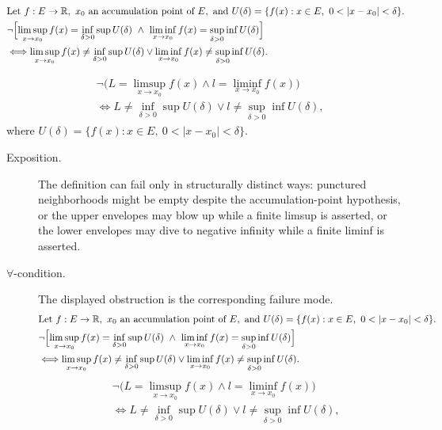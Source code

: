 \begin{remark*}
\[
\begin{aligned}
&\text{Let } f:E\to\mathbb{R},\ x_0 \text{ an accumulation point of } E,\ \text{and } U(\delta)=\{f(x):x\in E,\ 0<|x-x_0|<\delta\}.\\
&\neg\Bigl[\limsup_{x\to x_0} f(x)=\inf_{\delta>0}\sup U(\delta)\ \land\ \liminf_{x\to x_0} f(x)=\sup_{\delta>0}\inf U(\delta)\Bigr]\\
&\Longleftrightarrow
\limsup_{x\to x_0} f(x)\ne\inf_{\delta>0}\sup U(\delta)
\lor
\liminf_{x\to x_0} f(x)\ne\sup_{\delta>0}\inf U(\delta).
\end{aligned}
\]
\end{remark*}

\begin{remark*}
\[
\begin{aligned}
&\neg\bigl(L=\limsup_{x\to x_0} f(x)\land l=\liminf_{x\to x_0} f(x)\bigr)\\
&\Longleftrightarrow
L\ne\inf_{\delta>0}\sup U(\delta)
\lor
l\ne\sup_{\delta>0}\inf U(\delta),
\end{aligned}
\]
where $U(\delta)=\{f(x):x\in E,\ 0<|x-x_0|<\delta\}$.
\end{remark*}

\begin{remark*}
\begin{description}
  \item[Exposition.]
The definition can fail only in structurally distinct ways: punctured neighborhoods might be empty despite the accumulation-point hypothesis, or the upper envelopes may blow up while a finite limsup is asserted, or the lower envelopes may dive to negative infinity while a finite liminf is asserted.


  \item[\(\forall\)-condition.]
  The displayed obstruction is the corresponding failure mode.
  \[
\begin{aligned}
&\text{Let } f:E\to\mathbb{R},\ x_0 \text{ an accumulation point of } E,\ \text{and } U(\delta)=\{f(x):x\in E,\ 0<|x-x_0|<\delta\}.\\
&\neg\Bigl[\limsup_{x\to x_0} f(x)=\inf_{\delta>0}\sup U(\delta)\ \land\ \liminf_{x\to x_0} f(x)=\sup_{\delta>0}\inf U(\delta)\Bigr]\\
&\Longleftrightarrow
\limsup_{x\to x_0} f(x)\ne\inf_{\delta>0}\sup U(\delta)
\lor
\liminf_{x\to x_0} f(x)\ne\sup_{\delta>0}\inf U(\delta).
\end{aligned}
  \]
  \[
\begin{aligned}
&\neg\bigl(L=\limsup_{x\to x_0} f(x)\land l=\liminf_{x\to x_0} f(x)\bigr)\\
&\Longleftrightarrow
L\ne\inf_{\delta>0}\sup U(\delta)
\lor
l\ne\sup_{\delta>0}\inf U(\delta),
\end{aligned}
  \]
\end{description}
\end{remark*}

